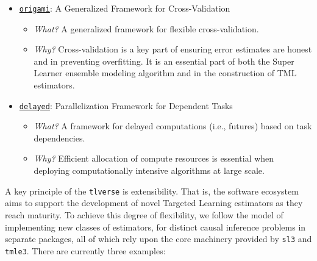 \documentclass[
  12pt, krantz2,
]{krantz}
\newcommand{\passthrough}[1]{#1}
\providecommand{\tightlist}{%
  \setlength{\itemsep}{0pt}\setlength{\parskip}{0pt}}
\newcommand{\1}{\mathbbm{1}}
\theoremstyle{definition}
\theoremstyle{definition}
\theoremstyle{definition}
\theoremstyle{definition}
\theoremstyle{remark}
\begin{document}
\begin{itemize}
\tightlist
\item
  \href{https://github.com/tlverse/origami}{\passthrough{\lstinline!origami!}}: A Generalized Framework for
  Cross-Validation \citep{coyle2018origami}

  \begin{itemize}
  \tightlist
  \item
    \emph{What?} A generalized framework for flexible cross-validation.
  \item
    \emph{Why?} Cross-validation is a key part of ensuring error estimates are honest
    and in preventing overfitting. It is an essential part of both the Super
    Learner ensemble modeling algorithm and in the construction of TML
    estimators.
  \end{itemize}
\item
  \href{https://github.com/tlverse/delayed}{\passthrough{\lstinline!delayed!}}: Parallelization Framework for
  Dependent Tasks

  \begin{itemize}
  \tightlist
  \item
    \emph{What?} A framework for delayed computations (i.e., futures) based on task
    dependencies.
  \item
    \emph{Why?} Efficient allocation of compute resources is essential when deploying
    computationally intensive algorithms at large scale.
  \end{itemize}
\end{itemize}

A key principle of the \passthrough{\lstinline!tlverse!} is extensibility. That is, the software
ecosystem aims to support the development of novel Targeted Learning estimators
as they reach maturity. To achieve this degree of flexibility, we follow the
model of implementing new classes of estimators, for distinct causal inference
problems in separate packages, all of which rely upon the core machinery
provided by \passthrough{\lstinline!sl3!} and \passthrough{\lstinline!tmle3!}. There are currently three examples:
\end{document}
